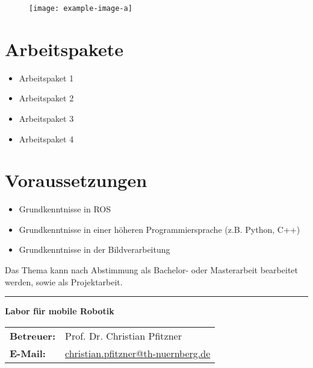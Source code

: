 \documentclass{ohm_project_description}
\begin{document}
\maketitle
\thispagestyle{fancy}

\vspace*{-3cm}
\begin{figure}[h!]
    \centering
    \texttt{[image: example-image-a]}
\end{figure} 


\lipsum[1-2]


\section*{Arbeitspakete}
\begin{itemize}[leftmargin=0.5cm]
    \item Arbeitspaket 1
    \item Arbeitspaket 2
    \item Arbeitspaket 3
    \item Arbeitspaket 4
\end{itemize}

\section*{Voraussetzungen}
\begin{itemize}[leftmargin=0.5cm]
    \item Grundkenntnisse in ROS 
    \item Grundkenntnisse in einer höheren Programmiersprache (z.B. Python, C++)
    \item Grundkenntnisse in der Bildverarbeitung
\end{itemize}

\vspace{0.5cm}
Das Thema kann nach Abstimmung als Bachelor- oder Masterarbeit bearbeitet werden, sowie als Projektarbeit. 


\vfill
\textcolor{ohm_red}{\rule{\linewidth}{0.4mm}}
\textbf{\textcolor{ohm_red}{Labor für mobile Robotik}} \\
\begin{tabular}{@{}ll}
\textbf{Betreuer:} & Prof. Dr. Christian Pfitzner \\
\textbf{E-Mail:}   & \href{mailto:christian.pfitzner@th-nuernberg.de}{christian.pfitzner@th-nuernberg.de} \\
\end{tabular}
\end{document}

